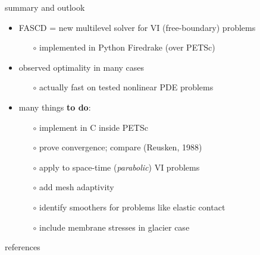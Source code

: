 \documentclass[svgnames,
               hyperref={colorlinks,citecolor=DeepPink4,linkcolor=FireBrick,urlcolor=Maroon},
               usepdftitle=false]  %
               {beamer}
\begin{document}
\begin{frame}{summary and outlook}

\begin{itemize}
\item FASCD = new multilevel solver for VI (free-boundary) problems
    \begin{itemize}
    \item[$\circ$] implemented in Python Firedrake (over PETSc)
    \end{itemize}
\item observed optimality in many cases
    \begin{itemize}
    \item[$\circ$] actually fast on tested nonlinear PDE problems
    \end{itemize}

\bigskip\bigskip
\item many things \textbf{{\color{FireBrick} to do}}:
    \begin{itemize}
    \item[$\circ$] implement in C inside PETSc
    \item[$\circ$] prove convergence; compare (Reusken, 1988)
    \item[$\circ$] apply to space-time (\emph{parabolic}) VI problems
    \item[$\circ$] add mesh adaptivity
    \item[$\circ$] identify smoothers for problems like elastic contact
    \item[$\circ$] include membrane stresses in glacier case
    \end{itemize}
\end{itemize}
\end{frame}


\begin{frame}{references}

{\footnotesize

}
\end{frame}
\end{document}
